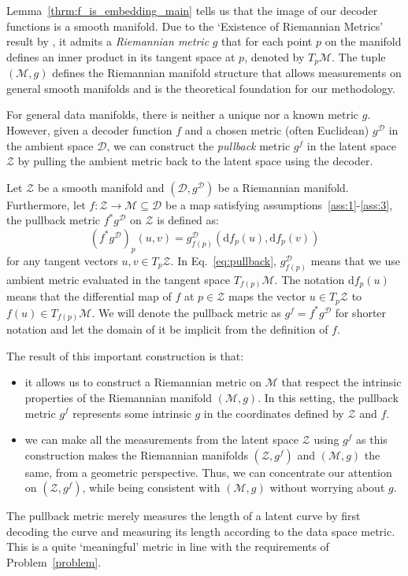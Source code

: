 Lemma~\ref{thrm:f_is_embedding_main} tells us that the image of our decoder functions is a smooth manifold. Due to the `Existence of Riemannian Metrics' result by \citet{lee2003introduction}, it admits a \emph{Riemannian metric} $g$ that for each point $p$ on the manifold defines an inner product in its tangent space at $p$, denoted by $T_p\mathcal{M}$. The tuple $(\mathcal{M}, g)$ defines the Riemannian manifold structure that allows measurements on general smooth manifolds and is the theoretical foundation for our methodology.

For general data manifolds, there is neither a unique nor a known metric $g$. However, given a decoder function $f$ and a chosen metric (often Euclidean) $g^{\mathcal{D}}$ in the ambient space $\mathcal{D}$, we can construct the \emph{pullback} metric $g^f$ in the latent space $\mathcal{Z}$ by pulling the ambient metric back to the latent space using the decoder. 


\begin{definition}
    \label{def:pullback_metric} Let $\mathcal{Z}$ be a smooth manifold and $(\mathcal{D},g^{\mathcal{D}})$ be a Riemannian manifold. Furthermore, let $f: \mathcal{Z} \rightarrow \mathcal{M} \subseteq \mathcal{D}$ be a map satisfying assumptions~\ref{ass:1}-\ref{ass:3}, the pullback metric $f^*g^{\mathcal{D}}$ on $\mathcal{Z}$ is defined as:
\begin{equation}
\label{eq:pullback}
    (f^*g^{\mathcal{D}})_p(u, v) = g^{\mathcal{D}}_{f(p)}(\mathrm{d}f_p(u), \mathrm{d}f_p(v))
\end{equation}
for any tangent vectors $u, v \in T_p\mathcal{Z}$. In Eq.~\ref{eq:pullback}, $g^{\mathcal{D}}_{f(p)}$ means that we use ambient metric evaluated in the tangent space $T_{f(p)}\mathcal{M}$. The notation $\mathrm{d}f_p(u)$ means that the differential map of $f$ at $p\in \mathcal{Z}$ maps the vector $u \in T_p\mathcal{Z}$ to $f(u) \in T_{f(p)}\mathcal{M}$. We will denote the pullback metric as $g^{f}=f^*g^\mathcal{D}$ for shorter notation and let the domain of it be implicit from the definition of $f$.
\end{definition}

The result of this important construction is that:
\begin{itemize}
    \item it allows us to construct a Riemannian metric on $\mathcal{M}$ that respect the intrinsic properties of the Riemannian manifold $(\mathcal{M},g)$. In this setting, the pullback metric $g^f$ represents some intrinsic $g$ in the coordinates defined by $\mathcal{Z}$ and $f$.
    \item we can make all the measurements from the latent space $\mathcal{Z}$ using $g^f$ as this construction makes the Riemannian manifolds $(\mathcal{Z},g^f)$ and $(\mathcal{M},g)$ the same, from a geometric perspective. Thus, we can concentrate our attention on $(\mathcal{Z},g^f)$, while being consistent with $(\mathcal{M},g)$ without worrying about $g$.
\end{itemize}
The pullback metric merely measures the length of a latent curve by first decoding the curve and measuring its length according to the data space metric. This is a quite `meaningful' metric in line with the requirements of Problem~\ref{problem}.


